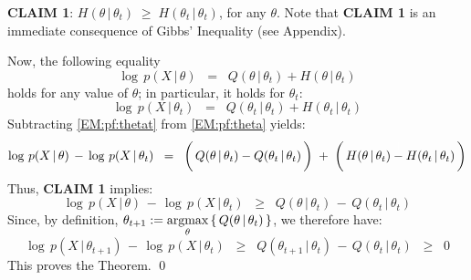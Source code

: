 \vskip 0.5cm
\noindent
\textbf{CLAIM 1}:\;\; $H(\theta\,|\,\theta_{t}) \;\geq\; H(\theta_{t}\,|\,\theta_{t})$,\;\; for any $\theta$.
\vskip 0.3cm
\noindent
Note that \textbf{CLAIM 1} is an immediate consequence of Gibbs' Inequality (see Appendix).

\vskip 0.3cm
\noindent
Now, the following equality
\begin{equation}
\label{EM:pf:theta}
\log\,p(X\,|\,\theta)
\;\; = \;\;
Q(\theta\,|\,\theta_{t}) + H(\theta\,|\,\theta_{t})
\end{equation}
holds for any value of $\theta$; in particular, it holds for $\theta_{t}$:
\begin{equation}
\label{EM:pf:thetat}
\log\,p(X\,|\,\theta_{t})
\;\; = \;\;
Q(\theta_{t}\,|\,\theta_{t}) + H(\theta_{t}\,|\,\theta_{t})
\end{equation}
Subtracting \eqref{EM:pf:thetat} from \eqref{EM:pf:theta} yields:
\begin{equation}
\log\,p(X\,|\,\theta) \,-\, \log\,p(X\,|\,\theta_{t})
\;\; = \;\;
\left(\,Q(\theta\,|\,\theta_{t}) \overset{{\color{white}\vert}}{-} Q(\theta_{t}\,|\,\theta_{t})\,\right)
\;+\;
\left(\,H(\theta\,|\,\theta_{t}) \overset{{\color{white}\vert}}{-} H(\theta_{t}\,|\,\theta_{t})\,\right)
\end{equation}
Thus, \textbf{CLAIM 1} implies:
\begin{equation}
\log\,p(X\,|\,\theta) \,-\, \log\,p(X\,|\,\theta_{t})
\;\; \geq \;\;
Q(\theta\,|\,\theta_{t}) \,-\, Q(\theta_{t}\,|\,\theta_{t})
\end{equation}
Since, by definition, $\theta_{t+1} := \underset{\theta}{\textnormal{argmax}}\left\{\,Q(\theta\,|\,\theta_{t})\,\right\}$,
we therefore have:
\begin{equation}
\log\,p(X\,|\,\theta_{t+1}) \,-\, \log\,p(X\,|\,\theta_{t})
\;\; \geq \;\;
Q(\theta_{t+1}\,|\,\theta_{t}) \,-\, Q(\theta_{t}\,|\,\theta_{t})
\;\; \geq \;\;
0
\end{equation}
This proves the Theorem.  \qed

